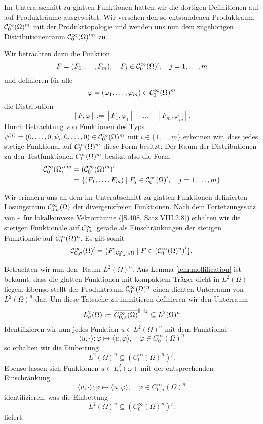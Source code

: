 Im Unterabschnitt zu glatten Funktionen hatten wir die dortigen Definitionen auf auf Produkträume ausgeweitet.
Wir versehen den so entstandenen Produktraum $\mathcal{C}_0^\infty(\Omega)^m$ mit der Produkttopologie und wenden uns nun dem zugehörigen Distributionenraum $\mathcal{C}_0^\infty(\Omega)'^m$ zu.

Wir betrachten dazu die Funktion
$$
  F = (F_1, \dots, F_m), \quad F_j \in \mathcal{C}_0^\infty(\Omega)', \quad j = 1, \dots, m
$$
und definieren für alle 
$$\varphi = (\varphi_1, \dots, \varphi_m) \in \mathcal{C}_0^\infty(\Omega)^m$$
die Distribution
$$
[F, \varphi] := [F_1, \varphi_1] + \dots + [F_m, \varphi_m].
$$
Durch Betrachtung von Funktionen des Typs $\psi^{(i)} = (0, \dots,0, \psi_i, 0,\dots,0) \in \mathcal{C}_0^\infty(\Omega)^m$ mit $i \in \{1,\dots,m\}$ erkennen wir, dass jedes stetige Funktional auf $\mathcal{C}_0^\infty(\Omega)^m$ diese Form besitzt.
Der Raum der Distributionen zu den Testfunktionen $\mathcal{C}_0^\infty(\Omega)^m$ besitzt also die Form
\begin{align*}
  \mathcal{C}_0^\infty(\Omega)'^{\,m}
  &= (\mathcal{C}_0^\infty(\Omega)^m)' \\
  &= \{(F_1,\dots,F_m) \mid F_j \in \mathcal{C}_0^\infty(\Omega)', \quad j = 1,\dots,m\}
\end{align*}

Wir erinnern uns an dem im Unterabschnitt zu glatten Funktionen definierten Lösungsraum $\mathcal{C}_{0, \sigma}^\infty(\Omega)$ der divergenzfreien Funktionen.
Nach dem Fortetzungssatz von \hahn\hyp{}\banach\ für lokalkonvexe Vektorräume (\cite{werner2011fa}[S.408, Satz VIII.2.8]) erhalten wir die stetigen Funktionale auf $\mathcal{C}_{0,\sigma}^\infty$ gerade als Einschränkungen der stetigen Funktionale auf $\mathcal{C}_0^\infty(\Omega)^n$. Es gilt somit
$$
\mathcal{C}_{0,\sigma}^\infty(\Omega)' = \{F|_{\mathcal{C}_{0,\sigma}^\infty(\Omega)} \mid F \in (\mathcal{C}_0^\infty(\Omega)^n)'\}.
$$

Betrachten wir nun den \hilbert\hyp{}Raum $L^2(\Omega)^n$.
Aus Lemma \ref{lem:mollification} ist bekannt, dass die glatten Funktionen mit kompaktem Träger dicht in $L^2(\Omega)$ liegen. 
Ebenso stellt der Produktraum $\mathcal{C}_0^\infty(\Omega)^n$ einen dichten Unterraum von $L^2(\Omega)^n$ dar.
Um diese Tatsache zu immitieren definieren wir den Unterraum 
$$
  L^2_\sigma(\Omega) 
  := \overline{C_{0,\sigma}^\infty(\Omega)}^{\lVert \cdot \rVert_2}
  \subseteq L^2(\Omega)^n
$$
Identifizieren wir nun jedes Funktion $u \in L^2(\Omega)^n$ mit dem Funktional
$$
\langle u, \cdot \rangle \colon \varphi \mapsto \langle u, \varphi \rangle, \quad \varphi \in C_0^\infty(\Omega)^n
$$
so erhalten wir die Einbettung 
$$
  L^2(\Omega)^n \subseteq (C_0^\infty(\Omega)^n)'.
$$
Ebenso lassen sich Funktionen $u \in L^2_\sigma(\omega)$ mit der entsprechenden Einschränkung
$$
\langle u, \cdot \rangle \colon \varphi \mapsto \langle u, \varphi \rangle, \quad \varphi \in C_{0,\sigma}^\infty(\Omega)^n
$$
identifizieren, was die Einbettung
$$
  L^2(\Omega)^n \subseteq (C_0^\infty(\Omega)^n)'.
$$
liefert.


